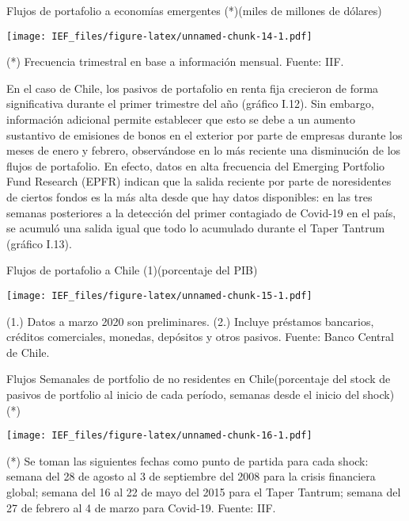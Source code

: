 \documentclass[
]{book}
\begin{document}
Flujos de portafolio a economías emergentes (*)(miles de millones de dólares)

\texttt{[image: IEF\_files/figure-latex/unnamed-chunk-14-1.pdf]}

(*) Frecuencia trimestral en base a información mensual.
Fuente: IIF.

En el caso de Chile, los pasivos de portafolio en renta fija crecieron de forma
significativa durante el primer trimestre del año (gráfico I.12). Sin embargo,
información adicional permite establecer que esto se debe a un aumento
sustantivo de emisiones de bonos en el exterior por parte de empresas durante
los meses de enero y febrero, observándose en lo más reciente una disminución
de los flujos de portafolio. En efecto, datos en alta frecuencia del Emerging
Portfolio Fund Research (EPFR) indican que la salida reciente por parte de noresidentes de ciertos fondos es la más alta desde que hay datos disponibles: en
las tres semanas posteriores a la detección del primer contagiado de Covid-19
en el país, se acumuló una salida igual que todo lo acumulado durante el Taper
Tantrum (gráfico I.13).

Flujos de portafolio a Chile (1)(porcentaje del PIB)

\texttt{[image: IEF\_files/figure-latex/unnamed-chunk-15-1.pdf]}

(1.) Datos a marzo 2020 son preliminares.
(2.) Incluye préstamos bancarios, créditos comerciales, monedas, depósitos y otros pasivos.
Fuente: Banco Central de Chile.

Flujos Semanales de portfolio de no residentes en Chile(porcentaje del stock de pasivos de portfolio al inicio de cada período, semanas desde el inicio del shock) (*)

\texttt{[image: IEF\_files/figure-latex/unnamed-chunk-16-1.pdf]}

(*) Se toman las siguientes fechas como punto de partida para cada shock: semana del 28 de agosto al 3 de septiembre del 2008 para la crisis financiera global; semana del 16 al 22 de mayo del 2015 para el Taper Tantrum; semana del 27 de febrero al 4 de marzo para Covid-19.
Fuente: IIF.
\end{document}
